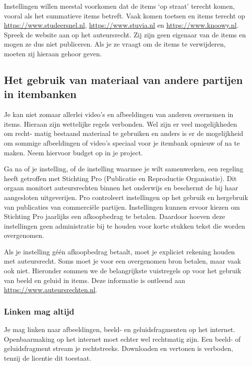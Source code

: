 \documentclass[
]{book}
\begin{document}
Instellingen willen meestal voorkomen dat de items `op straat' terecht komen, vooral als het summatieve items betreft. Vaak komen toetsen en items terecht op \url{https://www.studeersnel.nl}, \url{https://www.stuvia.nl} en \url{https://www.knoowy.nl}. Spreek de website aan op het auteursrecht. Zij zijn geen eigenaar van de items en mogen ze dus niet publiceren. Als je ze vraagt om de items te verwijderen, moeten zij hieraan gehoor geven.

\hypertarget{het-gebruik-van-materiaal-van-andere-partijen-in-itembanken}{%
\subsection{Het gebruik van materiaal van andere partijen in itembanken}\label{het-gebruik-van-materiaal-van-andere-partijen-in-itembanken}}

Je kan niet zomaar allerlei video's en afbeeldingen van anderen overnemen in items. Hieraan zijn wettelijke regels verbonden. Wel zijn er veel mogelijkheden om recht- matig bestaand materiaal te gebruiken en anders is er de mogelijkheid om sommige afbeeldingen of video's speciaal voor je itembank opnieuw of na te maken. Neem hiervoor budget op in je project.

Ga na of je instelling, of de instelling waarmee je wilt samenwerken, een regeling heeft getroffen met Stichting Pro (Publicatie en Reproductie Organisatie). Dit orgaan monitort auteursrechten binnen het onderwijs en beschermt de bij haar aangesloten uitgeverijen. Pro controleert instellingen op het gebruik en hergebruik van publicaties van commerciële partijen. Instellingen kunnen ervoor kiezen om Stichting Pro jaarlijks een afkoopbedrag te betalen. Daardoor hoeven deze instellingen geen administratie bij te houden voor korte stukken tekst die worden overgenomen.

Als je instelling géén afkoopbedrag betaalt, moet je expliciet rekening houden met auteursrecht. Soms moet je voor een overgenomen bron betalen, maar vaak ook niet. Hieronder sommen we de belangrijkste vuistregels op voor het gebruik van beeld en geluid in items. Deze informatie is ontleend aan \url{https://www.auteursrechten.nl}.

\hypertarget{linken-mag-altijd}{%
\subsubsection{Linken mag altijd}\label{linken-mag-altijd}}

Je mag linken naar afbeeldingen, beeld- en geluidsfragmenten op het internet. Openbaarmaking op het internet moet echter wel rechtmatig zijn. Een beeld- of geluidsfragment stream je rechtstreeks. Downloaden en vertonen is verboden, tenzij de licentie dit toestaat.
\end{document}
